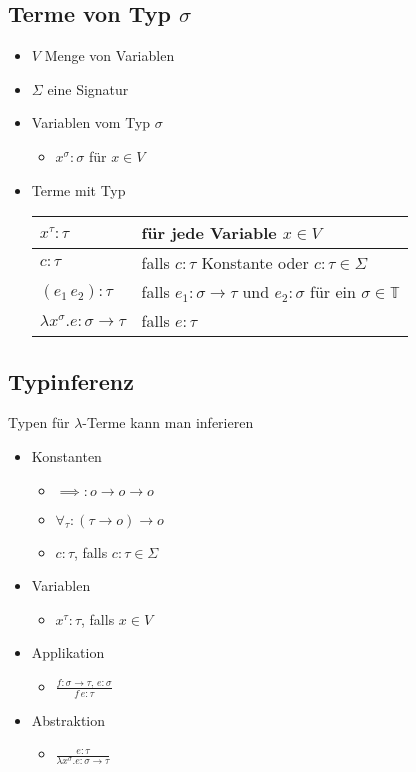 \documentclass{scrartcl}
\begin{document}
\subsection{Terme von Typ $ \sigma $}

\begin{itemize}
	\item $ V $ Menge von Variablen
	\item $ \Sigma $ eine Signatur
	\item Variablen vom Typ $ \sigma $
	\begin{itemize}
		\item $ x^\sigma : \sigma $ für $ x \in V $
	\end{itemize}
	\item Terme mit Typ \\
	\renewcommand{\arraystretch}{2}
	\begin{tabular}{l|l}
		$ x^\tau : \tau $ & für jede Variable $ x \in V $ \\ 
		\hline 
		$ c : \tau $ & falls $ c : \tau $ Konstante oder $ c : \tau \in \Sigma $ \\ 
		\hline 
		$ (e_1 \, e_2) : \tau $ & falls $ e_1 : \sigma \rightarrow \tau $ und $ e_2 : \sigma $ für ein $ \sigma \in \mathbb{T} $ \\ 
		\hline 
		$ \lambda x^\sigma .e : \sigma \rightarrow \tau $ & falls $ e : \tau $ \\ 
	\end{tabular} 
\end{itemize}

\subsection{Typinferenz}

Typen für $ \lambda $-Terme kann man inferieren

\begin{itemize}
	\item Konstanten
	\begin{itemize}
		\item $ \implies : o \rightarrow o \rightarrow o $
		\item $ \forall_\tau : (\tau \rightarrow o) \rightarrow o $
		\item $ c : \tau $, falls $ c : \tau \in \Sigma $
	\end{itemize}
	\item Variablen
	\begin{itemize}
		\item $ x^\tau : \tau $, falls $ x \in V $
	\end{itemize}
	\item Applikation
	\begin{itemize}
		\item $ \frac{f : \sigma \rightarrow \tau, \, e : \sigma}{f \, e : \tau} $
	\end{itemize}
	\item Abstraktion
	\begin{itemize}
		\item $ \frac{e : \tau}{\lambda x^\sigma .e : \sigma \rightarrow \tau} $
	\end{itemize}
\end{itemize}
\end{document}
